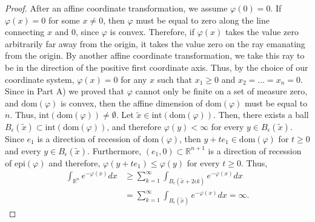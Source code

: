 \documentclass[10pt,a4paper]{amsart}
\begin{document}
\begin{proof}
After an affine coordinate transformation, we assume $\varphi(0) = 0$. If $\varphi(x) = 0$ for some $x \neq 0$, then $\varphi$ must be equal to zero along the line connecting $x$ and $0$, since $\varphi$ is convex. Therefore, if $\varphi(x)$ takes the value zero arbitrarily far away from the origin, it takes the value zero on the ray emanating from the origin. By another affine coordinate transformation, we take this ray to be in the direction of the positive first coordinate axis. Thus, by the choice of our coordinate system, $\varphi(x)=0$ for any $x$ such that $x_1 \geq 0$ and $x_2 = \dots = x_n = 0$. Since in Part A) we proved that $\varphi$ cannot only be finite on a set of measure zero, and $\text{dom}(\varphi)$ is convex, then the affine dimension of $\text{dom}(\varphi)$ must be equal to $n$. Thus, $\text{int}(\text{dom}(\varphi)) \neq \emptyset$. Let $\tilde{x} \in \text{int}(\text{dom}(\varphi))$. Then, there exists a ball $B_{\epsilon}(\tilde{x}) \subset \text{int}(\text{dom}(\varphi))$, and therefore $\varphi(y) <\infty$ for every $y \in B_{\epsilon}(\tilde{x})$. Since $e_1$ is a direction of recession of $\text{dom}(\varphi)$, then $y + te_1 \in \text{dom}(\varphi)$ for $t\geq 0$ and every $y \in B_{\epsilon}(\tilde{x})$. Furthermore, $(e_1, 0) \subset \mathbb{R}^{n+1}$ is a direction of recession of $\text{epi}(\varphi)$ and therefore, $\varphi(y + t e_1) \leq \varphi(y)$ for every $t \geq 0$.  Thus,
\begin{align}
\int_{\mathbb{R}^n} e^{-\varphi(x)}dx &\geq \sum_{k=1}^{\infty} \int_{B_{\epsilon}(\tilde{x} + 2 \epsilon k)} e^{-\varphi(x)}dx \\
&=\sum_{k=1}^{\infty} \int_{B_{\epsilon}(\tilde{x})} e^{-\varphi(x)}dx = \infty.
\end{align}


\end{proof}
\end{document}
